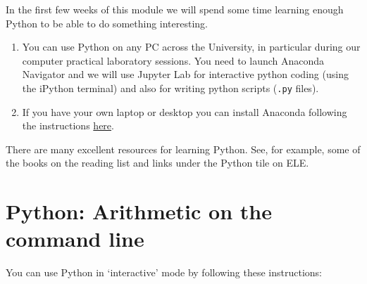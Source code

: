 In the first few weeks of this module we will spend some time learning
enough Python to be able to do something interesting.


\begin{enumerate}

\item
You can use Python on any PC across the University, in particular
during our computer practical laboratory sessions. You need to launch
Anaconda Navigator and we will use Jupyter Lab for interactive python
coding (using the iPython terminal) and also for writing python
scripts (\texttt{.py} files).
\item
If you have your own laptop or desktop you can install Anaconda following the instructions \href{https://www.anaconda.com/download}{here}.
\end{enumerate}


There are many excellent resources for learning Python. See, for
example, some of the books on the reading list and links under the
Python tile on ELE.


\section{Python: Arithmetic on the command line}

You can use Python in `interactive' mode by following these instructions:


